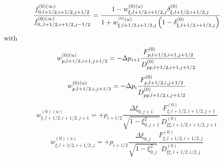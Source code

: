 \begin{equation}
\frac{f_{0,l+1/2,i+1/2,j+1/2}^{\left( 0\right) (\infty )}}{%
f_{0,,l+1/2,i+1/2,j-1/2}^{\left( 0\right) (\infty )}}=\frac{1-w_{\xi
,l+1/2,i+1/2,j}^{\left( 0\right) (u)}\delta _{\xi ,l+1/2,i+1/2,j}^{\left(
0\right) }}{1+w_{\xi ,l+1/2,i+1/2,j}^{^{\left( 0\right) }(u)}\left( 1-\delta
_{\xi ,l+1/2,i+1/2,j}^{\left( 0\right) }\right) }
\end{equation}
with
\begin{equation}
w_{p,l+1/2,i+1,j+1/2}^{\left( 0\right) (u)}=-\Delta p_{i+1}\frac{%
F_{p,l+1/2,i+1,j+1/2}^{\left( 0\right) }}{D_{pp,l+1/2,i+1,j+1/2}^{\left(
0\right) }}
\end{equation}
\begin{equation}
w_{p,l+1/2,i,j+1/2}^{\left( 0\right) (u)}=-\Delta p_{i}\frac{%
F_{p,l+1/2,i,j+1/2}^{\left( 0\right) }}{D_{pp,l+1/2,i,j+1/2}^{\left(
0\right) }}
\end{equation}
\begin{equation}
w_{\xi ,l+1/2,i+1/2,j+1}^{\left( 0\right) (u)}=+p_{i+1/2}\frac{\Delta \xi
_{0,j+1}}{\sqrt{1-\xi _{0,j+1}^{2}}}\frac{F_{\xi ,l+1/2,i+1/2,j+1}^{\left(
0\right) }}{D_{\xi \xi ,l+1/2,i+1/2,j+1}^{\left( 0\right) }}
\end{equation}
\begin{equation}
w_{\xi ,l+1/2,i+1/2,j}^{\left( 0\right) (u)}=+p_{i+1/2}\frac{\Delta \xi
_{0,j}}{\sqrt{1-\xi _{0,j}^{2}}}\frac{F_{\xi ,l+1/2,i+1/2,j}^{\left(
0\right) }}{D_{\xi \xi ,l+1/2,i/2,j}^{\left( 0\right) }}
\end{equation}

